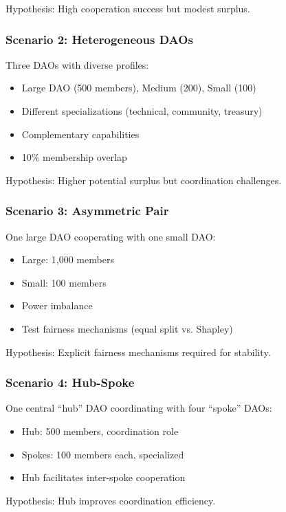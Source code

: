 Hypothesis: High cooperation success but modest surplus.

\subsubsection{Scenario 2: Heterogeneous DAOs}

Three DAOs with diverse profiles:
\begin{itemize}
    \item Large DAO (500 members), Medium (200), Small (100)
    \item Different specializations (technical, community, treasury)
    \item Complementary capabilities
    \item 10\% membership overlap
\end{itemize}

Hypothesis: Higher potential surplus but coordination challenges.

\subsubsection{Scenario 3: Asymmetric Pair}

One large DAO cooperating with one small DAO:
\begin{itemize}
    \item Large: 1,000 members
    \item Small: 100 members
    \item Power imbalance
    \item Test fairness mechanisms (equal split vs. Shapley)
\end{itemize}

Hypothesis: Explicit fairness mechanisms required for stability.

\subsubsection{Scenario 4: Hub-Spoke}

One central ``hub'' DAO coordinating with four ``spoke'' DAOs:
\begin{itemize}
    \item Hub: 500 members, coordination role
    \item Spokes: 100 members each, specialized
    \item Hub facilitates inter-spoke cooperation
\end{itemize}

Hypothesis: Hub improves coordination efficiency.

